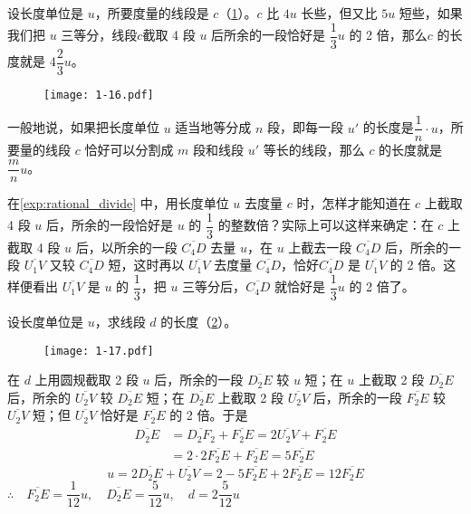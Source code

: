\begin{example}\label{exp:rational_divide}
设长度单位是 $u$，所要度量的线段是 $c$（\cref{fig:1-16}）。$c$ 比 $4u$ 长些，但又比 $5u$ 短些，如果我们把 $u$ 三等分，线段$c$截取 4 段 $u$ 后所余的一段恰好是 $\dfrac{1}{3}u$ 的 2 倍，那么$c$ 的长度就是 $4\dfrac{2}{3}u$。

\begin{figure}
	\centering
  \texttt{[image: 1-16.pdf]}
	\caption{}\label{fig:1-16}
\end{figure}
{\linespread{1.65}\selectfont
一般地说，如果把长度单位 $u$ 适当地等分成 $n$ 段，即每一段 $u'$ 的长度是$\dfrac{1}{n}\cdot u$，所要量的线段 $c$ 恰好可以分割成 $m$ 段和线段 $u'$ 等长的线段，那么 $c$ 的长度就是 $\dfrac{m}{n}u$。

在\cref{exp:rational_divide} 中，用长度单位 $u$ 去度量 $c$ 时，怎样才能知道在 $c$ 上截取 4 段 $u$ 后，所余的一段恰好是 $u$ 的 $\dfrac{1}{3}$ 的整数倍？实际上可以这样来确定：在 $c$ 上截取 4 段 $u$ 后，以所余的一段 $\overline{C_4D}$ 去量 $u$，在 $u$ 上截去一段 $\overline{C_4D}$ 后，所余的一段 $\overline{U_1V}$ 又较 $\overline{C_4D}$ 短，这时再以 $\overline{U_1V}$ 去度量 $\overline{C_4D}$，恰好$\overline{C_4D}$ 是 $\overline{U_1V}$ 的 2 倍。这样便看出 $\overline{U_1V}$ 是 $u$ 的 $\dfrac{1}{3}$，把 $u$ 三等分后，$\overline{C_4D}$ 就恰好是 $\dfrac{1}{3}u$ 的 2 倍了。\par}
\end{example}

\begin{example}\label{exp:rational_divide2}
	设长度单位是 $u$，求线段 $d$ 的长度（\cref{fig:1-17}）。
\begin{figure}
	\centering
  \texttt{[image: 1-17.pdf]}
	\caption{}\label{fig:1-17}
\end{figure}
\end{example}

\begin{solution}
在 $d$ 上用圆规截取 2 段 $u$ 后，所余的一段 $\overline{D_2E}$ 较 $u$ 短；在 $u$ 上截取 2 段 $\overline{D_2E}$ 后，所余的 $\overline{U_2V}$ 较 $\overline{D_2E}$ 短；在 $\overline{D_2E}$ 上截取 2 段 $\overline{U_2V}$ 后，所余的一段 $\overline{F_2E}$ 较 $\overline{U_2V}$ 短；但 $\overline{U_2V}$ 恰好是 $\overline{F_2E}$ 的 2 倍。于是
\[\begin{split}
	\overline{D_2E}&=\overline{D_2F_2}+\overline{F_2E}=2\overline{U_2V}+\overline{F_2E}\\
&=2\cdot 2\overline{F_2E}+\overline{F_2E}=5\overline{F_2E}
\end{split}\]
\[u=2\overline{D_2E}+\overline{U_2V}=2-5\overline{F_2E}+2\overline{F_2E}=12\overline{F_2E}\]
$\therefore\quad \overline{F_2E}=\dfrac{1}{12}u,\quad \overline{D_2E}=\dfrac{5}{12}u,\quad d=2\dfrac{5}{12}u$
\end{solution}

